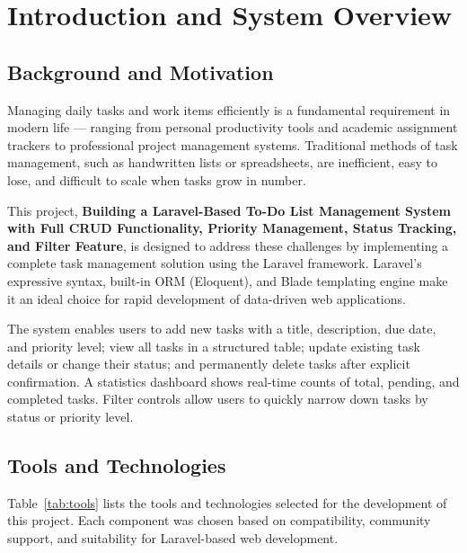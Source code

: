 \documentclass[12pt,a4paper]{report}
\begin{document}
\tableofcontents
\listoftables
\listoffigures

\clearpage
{}

\chapter{Introduction and System Overview}

\section{Background and Motivation}

Managing daily tasks and work items efficiently is a fundamental requirement in
modern life — ranging from personal productivity tools and academic assignment
trackers to professional project management systems. Traditional methods of task
management, such as handwritten lists or spreadsheets, are inefficient, easy to lose,
and difficult to scale when tasks grow in number.

This project, \textbf{Building a Laravel-Based To-Do List Management System with
Full CRUD Functionality, Priority Management, Status Tracking, and Filter Feature},
is designed to address these challenges by implementing a complete task management
solution using the Laravel framework. Laravel's expressive syntax, built-in ORM
(Eloquent), and Blade templating engine make it an ideal choice for rapid development
of data-driven web applications.

The system enables users to add new tasks with a title, description, due date, and
priority level; view all tasks in a structured table; update existing task details or
change their status; and permanently delete tasks after explicit confirmation. A
statistics dashboard shows real-time counts of total, pending, and completed tasks.
Filter controls allow users to quickly narrow down tasks by status or priority level.

\section{Tools and Technologies}

Table~\ref{tab:tools} lists the tools and technologies selected for the development of
this project. Each component was chosen based on compatibility, community support,
and suitability for Laravel-based web development.
\end{document}
